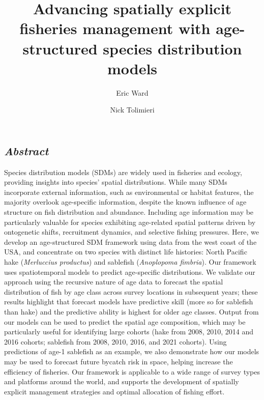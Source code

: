 \documentclass[
]{article}
\title{Advancing spatially explicit fisheries management with
age-structured species distribution models}
\author{Eric Ward}
\author{Nick Tolimieri}
\affil{%
          Conservation Biology Division, Northwest Fisheries Science
          Center, National Marine Fisheries Service, National
          Oceanographic and Atmospheric Administration, 2725 Montlake
          Blvd E, Seattle WA 98112
        }
\date{}
\begin{document}
\maketitle
\ifdefined\Shaded\renewenvironment{Shaded}{\begin{tcolorbox}[frame hidden, interior hidden, borderline west={3pt}{0pt}{shadecolor}, sharp corners, breakable, boxrule=0pt, enhanced]}{\end{tcolorbox}}\fi

\hypertarget{abstract}{%
\subsection{\texorpdfstring{\emph{Abstract}}{Abstract}}\label{abstract}}

Species distribution models (SDMs) are widely used in fisheries and
ecology, providing insights into species' spatial distributions. While
many SDMs incorporate external information, such as environmental or
habitat features, the majority overlook age-specific information,
despite the known influence of age structure on fish distribution and
abundance. Including age information may be particularly valuable for
species exhibiting age-related spatial patterns driven by ontogenetic
shifts, recruitment dynamics, and selective fishing pressures. Here, we
develop an age-structured SDM framework using data from the west coast
of the USA, and concentrate on two species with distinct life histories:
North Pacific hake (\emph{Merluccius productus}) and sablefish
(\emph{Anoplopoma fimbria}). Our framework uses spatiotemporal models to
predict age-specific distributions. We validate our approach using the
recursive nature of age data to forecast the spatial distribution of
fish by age class across survey locations in subsequent years; these
results highlight that forecast models have predictive skill (more so
for sablefish than hake) and the predictive ability is highest for older
age classes. Output from our models can be used to predict the spatial
age composition, which may be particularly useful for identifying large
cohorts (hake from 2008, 2010, 2014 and 2016 cohorts; sablefish from
2008, 2010, 2016, and 2021 cohorts). Using predictions of age-1
sablefish as an example, we also demonstrate how our models may be used
to forecast future bycatch risk in space, helping increase the
efficiency of fisheries. Our framework is applicable to a wide range of
survey types and platforms around the world, and supports the
development of spatially explicit management strategies and optimal
allocation of fishing effort.
\end{document}
